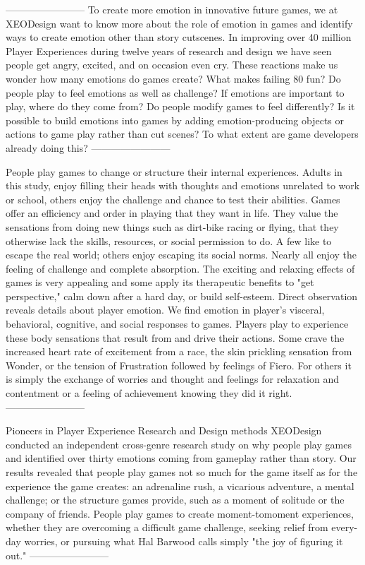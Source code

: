 ------------------------
To create more emotion in innovative future games, we at XEODesign want to know more
about the role of emotion in games and identify ways to create emotion other than story cutscenes. In improving over 40 million Player Experiences during twelve years of research and
design we have seen people get angry, excited, and on occasion even cry. These reactions
make us wonder how many emotions do games create? What makes failing 80%
fun? Do people play to feel emotions as well as challenge? If emotions are important to play,
where do they come from? Do people modify games to feel differently? Is it possible to build
emotions into games by adding emotion-producing objects or actions to game play rather than
cut scenes? To what extent are game developers already doing this?
------------------------

People play games to change or structure their internal experiences. Adults in this study, enjoy filling their heads with thoughts and emotions unrelated to work or school, others enjoy the challenge and chance to test their abilities. Games offer an efficiency and order in playing that they want in life. They value the sensations from doing new things such as dirt-bike racing or flying, that they otherwise lack the skills, resources, or social permission to do. A few like to escape the real world; others enjoy escaping its social norms. Nearly all enjoy the feeling of challenge and complete absorption. The exciting and relaxing effects of games is very appealing and some apply its therapeutic benefits to "get perspective," calm down after a hard day, or build self-esteem. Direct observation reveals details about player emotion. We find emotion in player’s visceral, behavioral, cognitive, and social responses to games. Players play to experience these body sensations that result from and drive their actions. Some crave the increased heart rate of excitement from a race, the skin prickling sensation from Wonder, or the tension of Frustration followed by feelings of Fiero. For others it is simply the exchange of worries and thought and feelings for relaxation and contentment or a feeling of achievement knowing they did it right.
------------------------

Pioneers in Player Experience Research and Design methods XEODesign conducted an
independent cross-genre research study on why people play games and identified over thirty
emotions coming from gameplay rather than story. Our results revealed that people play
games not so much for the game itself as for the experience the game creates: an adrenaline
rush, a vicarious adventure, a mental challenge; or the structure games provide, such as a
moment of solitude or the company of friends. People play games to create moment-tomoment experiences, whether they are overcoming a difficult game challenge, seeking relief
from every-day worries, or pursuing what Hal Barwood calls simply "the joy of figuring it out."
------------------------

